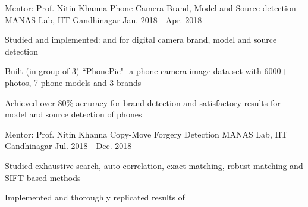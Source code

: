 \begin{cventries}
  \cventry
    {Mentor: Prof. Nitin Khanna} %
    {Phone Camera Brand, Model and Source detection } %
    {MANAS Lab, IIT Gandhinagar} %
    {Jan. 2018 - Apr. 2018} %
    {
      \begin{cvitems} %
        \item {Studied and implemented:  and  for digital camera brand, model and source detection}
        \item {Built (in group of 3) ``PhonePic"- a phone camera image data-set with 6000+ photos, 7 phone models and 3 brands}
        \item {Achieved over 80\% accuracy for brand detection and satisfactory results for model and source detection of phones}
      \end{cvitems}
    }

\cventry
    {Mentor: Prof. Nitin Khanna} %
    {Copy-Move Forgery Detection  {} {}} %
    {MANAS Lab, IIT Gandhinagar} %
    {Jul. 2018 - Dec. 2018} %
    {
      \begin{cvitems} %
        \item {Studied exhaustive search, auto-correlation, exact-matching, robust-matching and SIFT-based methods}
        \item {Implemented and thoroughly replicated results of }
      \end{cvitems}
    }


\end{cventries}
